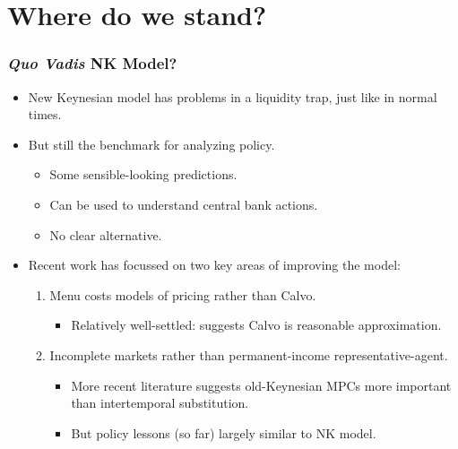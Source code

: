 \documentclass[english,xcolor=svgnames]{beamer}
\begin{document}
\section{Where do we stand?}

\begin{frame}
\frametitle{\emph{Quo Vadis} NK Model?}
\begin{itemize}
	\item New Keynesian model has problems in a liquidity trap, just like in normal times.
	\item But still the benchmark for analyzing policy.
	\begin{itemize}
		\item Some sensible-looking predictions.
		\item Can be used to understand central bank actions.
		\item No clear alternative.
	\end{itemize}	
	\item Recent work has focussed on two key areas of improving the model:
	\begin{enumerate}
		\item Menu costs models of pricing rather than Calvo.
		\begin{itemize}
			\item Relatively well-settled: suggests Calvo is reasonable approximation.
		\end{itemize}
		\item Incomplete markets rather than permanent-income representative-agent.
		\begin{itemize}
			\item More recent literature suggests old-Keynesian MPCs more important than intertemporal substitution.
			\item But policy lessons (so far) largely similar to NK model.
		\end{itemize}
	\end{enumerate}
\end{itemize}
\end{frame}
\end{document}
